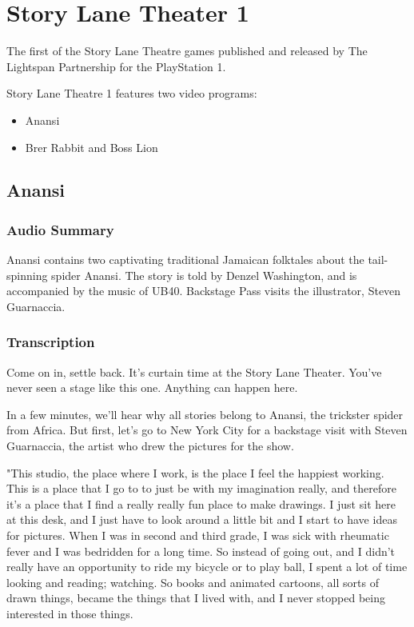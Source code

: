 \chapter{Story Lane Theater 1}


The first of the Story Lane Theatre games published and released by The Lightspan Partnership for the PlayStation 1.

Story Lane Theatre 1 features two video programs:

\begin{itemize}
    \item Anansi
    \item Brer Rabbit and Boss Lion
\end{itemize}

\clearpage
\newpage

\section{Anansi}

\subsection{Audio Summary}

Anansi contains two captivating traditional Jamaican folktales about the tail-spinning spider Anansi. The story is told by Denzel Washington, and is accompanied by the music of UB40. Backstage Pass visits the illustrator, Steven Guarnaccia.

\subsection{Transcription}

Come on in, settle back. It's curtain time at the Story Lane Theater. You've never seen a stage like this one. Anything can happen here.

In a few minutes, we'll hear why all stories belong to Anansi, the trickster spider from Africa. But first, let's go to New York City for a backstage visit with Steven Guarnaccia, the artist who drew the pictures for the show.

"This studio, the place where I work, is the place I feel the happiest working. This is a place that I go to to just be with my imagination really, and therefore it's a place that I find a really really fun place to make drawings. I just sit here at this desk, and I just have to look around a little bit and I start to have ideas for pictures. When I was in second and third grade, I was sick with rheumatic fever and I was bedridden for a long time. So instead of going out, and I didn't really have an opportunity to ride my bicycle or to play ball, I spent a lot of time looking and reading; watching. So books and animated cartoons, all sorts of drawn things, became the things that I lived with, and I never stopped being interested in those things.

